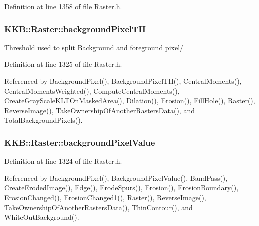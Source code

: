 Definition at line 1358 of file Raster.\+h.

\subsubsection[{\texorpdfstring{background\+Pixel\+TH}{backgroundPixelTH}}]{ K\+K\+B\+::\+Raster\+::background\+Pixel\+TH\hspace{0.3cm}{\ttfamily [protected]}}\hypertarget{class_k_k_b_1_1_raster_a3c4e96eaf48274f5d8912617f81f2a0b}{}\label{class_k_k_b_1_1_raster_a3c4e96eaf48274f5d8912617f81f2a0b}
Threshold used to split Background and foreground pixel/ 

Definition at line 1325 of file Raster.\+h.



Referenced by Background\+Pixel(), Background\+Pixel\+T\+H(), Central\+Moments(), Central\+Moments\+Weighted(), Compute\+Central\+Moments(), Create\+Gray\+Scale\+K\+L\+T\+On\+Masked\+Area(), Dilation(), Erosion(), Fill\+Hole(), Raster(), Reverse\+Image(), Take\+Ownership\+Of\+Another\+Rasters\+Data(), and Total\+Background\+Pixels().

\subsubsection[{\texorpdfstring{background\+Pixel\+Value}{backgroundPixelValue}}]{ K\+K\+B\+::\+Raster\+::background\+Pixel\+Value\hspace{0.3cm}{\ttfamily [protected]}}\hypertarget{class_k_k_b_1_1_raster_ab7ed2191cce116a6a37029dc6e3713ef}{}\label{class_k_k_b_1_1_raster_ab7ed2191cce116a6a37029dc6e3713ef}


Definition at line 1324 of file Raster.\+h.



Referenced by Background\+Pixel(), Background\+Pixel\+Value(), Band\+Pass(), Create\+Eroded\+Image(), Edge(), Erode\+Spurs(), Erosion(), Erosion\+Boundary(), Erosion\+Changed(), Erosion\+Changed1(), Raster(), Reverse\+Image(), Take\+Ownership\+Of\+Another\+Rasters\+Data(), Thin\+Contour(), and White\+Out\+Background().

